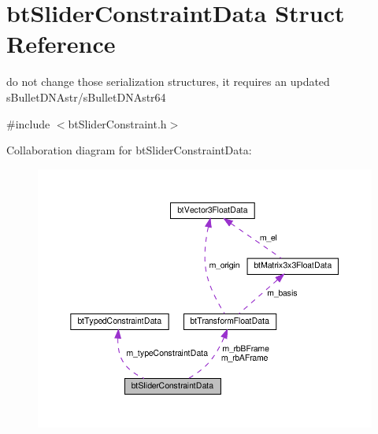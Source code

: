 \hypertarget{structbtSliderConstraintData}{}\section{bt\+Slider\+Constraint\+Data Struct Reference}
\label{structbtSliderConstraintData}


do not change those serialization structures, it requires an updated s\+Bullet\+D\+N\+Astr/s\+Bullet\+D\+N\+Astr64  




{\ttfamily \#include $<$bt\+Slider\+Constraint.\+h$>$}



Collaboration diagram for bt\+Slider\+Constraint\+Data\+:
\nopagebreak
\begin{figure}[H]
\begin{center}
\leavevmode
\includegraphics[width=350pt]{structbtSliderConstraintData__coll__graph}
\end{center}
\end{figure}
